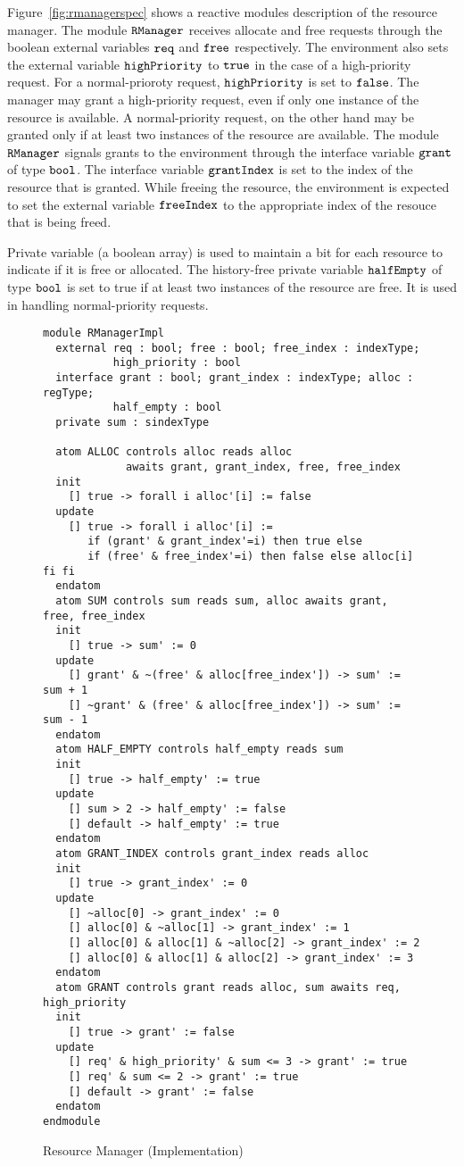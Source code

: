{\mypar
Figure~\ref{fig:rmanagerspec} shows a reactive modules description of
the resource manager. The module $\mbox{\tt RManager}$ receives allocate and free
requests through the boolean external variables $\mbox{\tt req}$ and $\mbox{\tt free}$
respectively. The environment also sets the external variable
$\mbox{\tt highPriority}$ to ${\tt true}$ in the case of a high-priority request.
For a normal-prioroty request, $\mbox{\tt highPriority}$ is set to ${\tt false}$.
The manager may grant a high-priority request, even if only one
instance of the resource is available. A normal-priority request, on
the other hand may be granted only if at least two instances of the
resource are available.
The module $\mbox{\tt RManager}$ signals grants to the environment through the
interface variable $\mbox{\tt grant}$ of type $\mbox{\tt bool}$. The interface variable
$\mbox{\tt grantIndex}$ is set to the index of the resource that is granted.
While freeing the resource, the environment is expected to set
the external variable $\mbox{\tt freeIndex}$ to the appropriate index of the
resouce that is being freed.

\mypar
Private variable \alloc (a boolean array) is used to maintain a bit
for each resource to indicate if it is free or allocated. The
history-free private variable $\mbox{\tt halfEmpty}$ of type $\mbox{\tt bool}$ is
set to true if at least two instances of the resource are free.
It is used in handling normal-priority requests.

\begin{figure}
\small
\begin{verbatim}
module RManagerImpl
  external req : bool; free : bool; free_index : indexType;
           high_priority : bool
  interface grant : bool; grant_index : indexType; alloc : regType;
           half_empty : bool
  private sum : sindexType

  atom ALLOC controls alloc reads alloc
             awaits grant, grant_index, free, free_index
  init
    [] true -> forall i alloc'[i] := false
  update
    [] true -> forall i alloc'[i] :=
       if (grant' & grant_index'=i) then true else
       if (free' & free_index'=i) then false else alloc[i] fi fi
  endatom
  atom SUM controls sum reads sum, alloc awaits grant, free, free_index
  init
    [] true -> sum' := 0
  update
    [] grant' & ~(free' & alloc[free_index']) -> sum' := sum + 1
    [] ~grant' & (free' & alloc[free_index']) -> sum' := sum - 1
  endatom
  atom HALF_EMPTY controls half_empty reads sum
  init
    [] true -> half_empty' := true
  update
    [] sum > 2 -> half_empty' := false
    [] default -> half_empty' := true
  endatom
  atom GRANT_INDEX controls grant_index reads alloc
  init
    [] true -> grant_index' := 0
  update
    [] ~alloc[0] -> grant_index' := 0
    [] alloc[0] & ~alloc[1] -> grant_index' := 1
    [] alloc[0] & alloc[1] & ~alloc[2] -> grant_index' := 2
    [] alloc[0] & alloc[1] & alloc[2] -> grant_index' := 3
  endatom
  atom GRANT controls grant reads alloc, sum awaits req, high_priority
  init
    [] true -> grant' := false
  update
    [] req' & high_priority' & sum <= 3 -> grant' := true
    [] req' & sum <= 2 -> grant' := true
    [] default -> grant' := false
  endatom
endmodule
\end{verbatim}
\caption{Resource Manager (Implementation)}
\label{fig:rmanagerimpl}
\end{figure}

}
